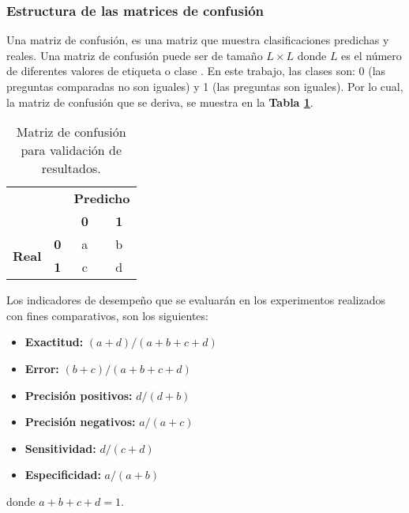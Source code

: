 \subsubsection{Estructura de las matrices de confusión}
Una matriz de confusión, es una matriz que muestra clasificaciones predichas y reales. Una matriz de confusión puede ser de tamaño \(L \times L\) donde \(L\) es el número de diferentes valores de etiqueta o clase \citep{provost1998glossary}. En este trabajo, las clases son: 0 (las preguntas comparadas no son iguales) y 1 (las preguntas son iguales). Por lo cual, la matriz de confusión que se deriva, se muestra en la \textbf{Tabla \ref{tab:matriz-confusion}}.

\begin{table}[]
	\centering
	\begin{tabular}{ll|c|c|}
		\cline{3-4}
		&                                 & \multicolumn{2}{c|}{\textbf{Predicho}} \\ \cline{3-4}
		&                                 & \textbf{0}         & \textbf{1}        \\ \hline
		\multicolumn{1}{|c|}{\multirow{2}{*}{\textbf{Real}}} & \multicolumn{1}{c|}{\textbf{0}} & a & b \\ \cline{2-4}
		\multicolumn{1}{|c|}{} & \multicolumn{1}{c|}{\textbf{1}} & c                  & d                 \\ \hline
	\end{tabular}
	\caption{Matriz de confusión para validación de resultados.}
	\label{tab:matriz-confusion}
\end{table}

Los indicadores de desempeño que se evaluarán en los experimentos realizados con fines comparativos, son los siguientes:
\begin{itemize}
	\item \textbf{Exactitud:} \((a+d)/(a+b+c+d)\)
	\item \textbf{Error:} \((b+c)/(a+b+c+d)\)
	\item \textbf{Precisión positivos:} \(d/(d + b)\)
	\item \textbf{Precisión negativos:} \(a/(a+c)\)
	\item \textbf{Sensitividad:} \(d/(c+d)\)
	\item \textbf{Especificidad:} \(a/(a+b)\)
\end{itemize}
donde \(a+b+c+d=1\).

